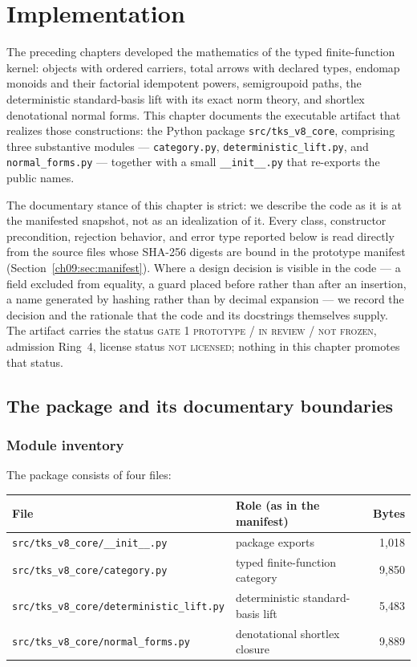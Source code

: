 \chapter{Implementation}\label{ch09:implementation}

The preceding chapters developed the mathematics of the typed finite-function
kernel: objects with ordered carriers, total arrows with declared types,
endomap monoids and their factorial idempotent powers, semigroupoid paths,
the deterministic standard-basis lift with its exact norm theory, and
shortlex denotational normal forms. This chapter documents the executable
artifact that realizes those constructions: the Python package
\texttt{src/tks\_v8\_core}, comprising three substantive modules ---
\texttt{category.py}, \texttt{deterministic\_lift.py}, and
\texttt{normal\_forms.py} --- together with a small \texttt{\_\_init\_\_.py}
that re-exports the public names.

The documentary stance of this chapter is strict: we describe the code as it
is at the manifested snapshot, not as an idealization of it. Every class,
constructor precondition, rejection behavior, and error type reported below
is read directly from the source files whose SHA-256 digests are bound in the
prototype manifest (Section~\ref{ch09:sec:manifest}). Where a design decision
is visible in the code --- a field excluded from equality, a guard placed
before rather than after an insertion, a name generated by hashing rather
than by decimal expansion --- we record the decision and the rationale that
the code and its docstrings themselves supply. The artifact carries the
status \textsc{gate 1 prototype / in review / not frozen}, admission Ring~4,
license status \textsc{not licensed}; nothing in this chapter promotes that
status.

\section{The package and its documentary boundaries}\label{ch09:sec:package}

\subsection{Module inventory}

The package consists of four files:

\begin{center}
\begin{tabular}{@{}llr@{}}
\toprule
File & Role (as in the manifest) & Bytes \\
\midrule
\texttt{src/tks\_v8\_core/\_\_init\_\_.py} & package exports & 1{,}018 \\
\texttt{src/tks\_v8\_core/category.py} & typed finite-function category & 9{,}850 \\
\texttt{src/tks\_v8\_core/deterministic\_lift.py} & deterministic standard-basis lift & 5{,}483 \\
\texttt{src/tks\_v8\_core/normal\_forms.py} & denotational shortlex closure & 9{,}889 \\
\bottomrule
\end{tabular}
\end{center}

